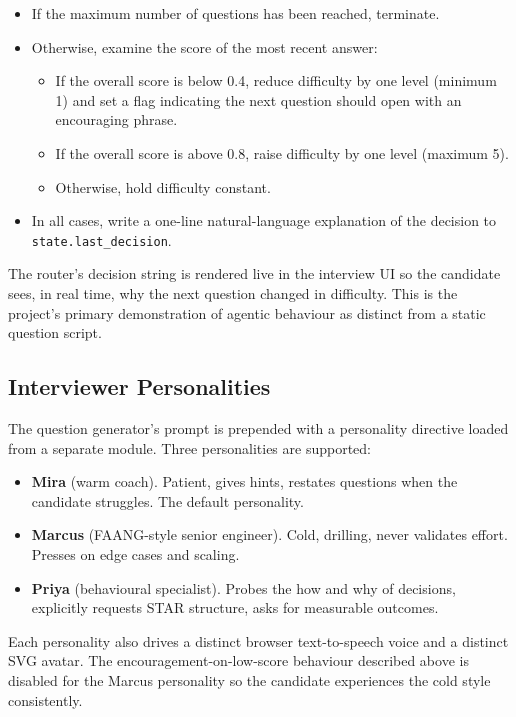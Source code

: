 \documentclass[11pt,a4paper]{article}
\begin{document}
\begin{itemize}
  \item If the maximum number of questions has been reached, terminate.
  \item Otherwise, examine the score of the most recent answer:
  \begin{itemize}
    \item If the overall score is below 0.4, reduce difficulty by one level
          (minimum 1) and set a flag indicating the next question should
          open with an encouraging phrase.
    \item If the overall score is above 0.8, raise difficulty by one level
          (maximum 5).
    \item Otherwise, hold difficulty constant.
  \end{itemize}
  \item In all cases, write a one-line natural-language explanation of the
        decision to \texttt{state.last\_decision}.
\end{itemize}

The router's decision string is rendered live in the interview UI so the
candidate sees, in real time, why the next question changed in difficulty.
This is the project's primary demonstration of agentic behaviour as
distinct from a static question script.

\subsection{Interviewer Personalities}

The question generator's prompt is prepended with a personality directive
loaded from a separate module. Three personalities are supported:

\begin{itemize}
  \item \textbf{Mira} (warm coach). Patient, gives hints, restates questions
        when the candidate struggles. The default personality.
  \item \textbf{Marcus} (FAANG-style senior engineer). Cold, drilling, never
        validates effort. Presses on edge cases and scaling.
  \item \textbf{Priya} (behavioural specialist). Probes the how and why of
        decisions, explicitly requests STAR structure, asks for measurable
        outcomes.
\end{itemize}

Each personality also drives a distinct browser text-to-speech voice and a
distinct SVG avatar. The encouragement-on-low-score behaviour described
above is disabled for the Marcus personality so the candidate experiences
the cold style consistently.
\end{document}
